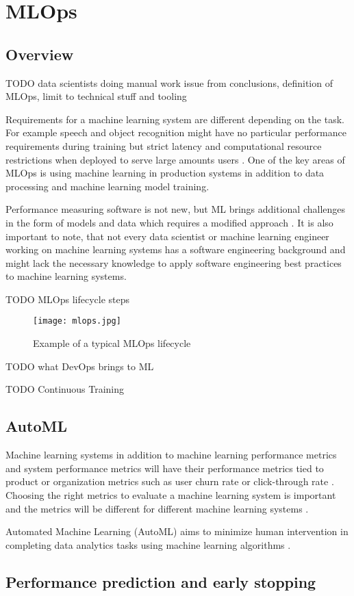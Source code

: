 \section{MLOps}
\label{sec:mldevops}

\subsection{Overview}

TODO \parencite{kreuzbergerMachineLearningOperations2022} data scientists doing manual work issue from conclusions, definition of MLOps, limit to technical stuff and tooling

Requirements for a machine learning system are different depending on the task. For example speech and object recognition might have no particular performance requirements during training but strict latency and computational resource restrictions when deployed to serve large amounts users \parencite{hintonDistillingKnowledgeNeural2015}. One of the key areas of MLOps is using machine learning in production systems in addition to data processing and machine learning model training.

Performance measuring software is not new, but ML brings additional challenges in the form of models and data which requires a modified approach \parencite{breckMLTestScore2017a}. It is also important to note, that not every data scientist or machine learning engineer working on machine learning systems has a software engineering background \parencite{finzerDataScienceEducation2013} and might lack the necessary knowledge to apply software engineering best practices to machine learning systems.

TODO MLOps lifecycle steps

\begin{figure}[h]
    \centering
    \texttt{[image: mlops.jpg]}
    \caption{Example of a typical MLOps lifecycle}
    \label{fig:devops}
\end{figure}

TODO what DevOps brings to ML

TODO Continuous Training

\subsection{AutoML}

Machine learning systems in addition to machine learning performance metrics and system performance metrics will have their performance metrics tied to product or organization metrics such as user churn rate or click-through rate \parencite{shankarOperationalizingMachineLearning2022}. Choosing the right metrics to evaluate a machine learning system is important and the metrics will be different for different machine learning systems \parencite{shankarOperationalizingMachineLearning2022}.

Automated Machine Learning (AutoML) aims to minimize human intervention in completing data analytics tasks using machine learning algorithms \parencite{yangIoTDataAnalytics2022}.

\subsection{Performance prediction and early stopping}

